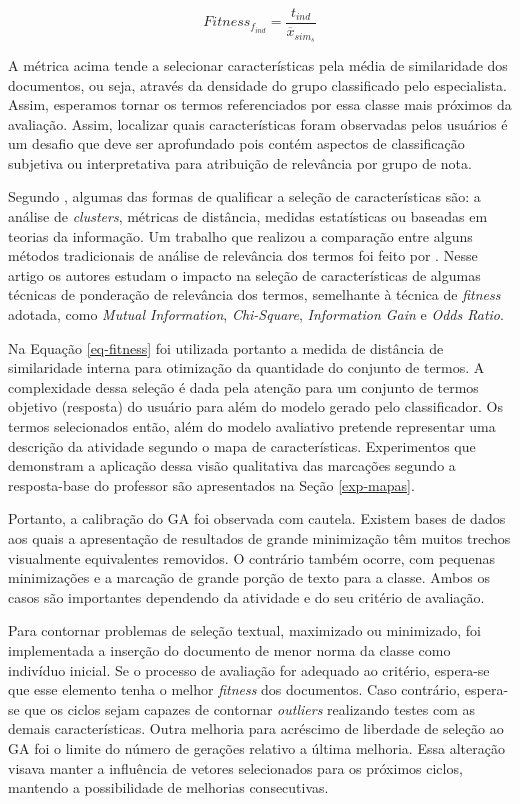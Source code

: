 \begin{equation}
Fitness_{f_{ind}} = \frac{t_{ind}}{\overline{x}_{sim_{s}}}
\label{eq-fitness}
\end{equation}

A métrica acima tende a selecionar características pela média de similaridade dos documentos, ou seja, através da densidade do grupo classificado pelo especialista. Assim, esperamos tornar os termos referenciados por essa classe mais próximos da avaliação. Assim, localizar quais características foram observadas pelos usuários é um desafio que deve ser aprofundado pois contém aspectos de classificação subjetiva ou interpretativa para atribuição de relevância por grupo de nota.


Segundo , algumas das formas de qualificar a seleção de características são: a análise de \textit{clusters}, métricas de distância, medidas estatísticas ou baseadas em teorias da informação. Um trabalho que realizou a comparação entre alguns métodos tradicionais de análise de relevância dos termos foi feito por . Nesse artigo os autores estudam o impacto na seleção de características de algumas técnicas de ponderação de relevância dos termos, semelhante à técnica de \textit{fitness} adotada, como \textit{Mutual Information}, \textit{Chi-Square}, \textit{Information Gain} e \textit{Odds Ratio}. 

Na Equação \ref{eq-fitness} foi utilizada portanto a medida de distância de similaridade interna para otimização da quantidade do conjunto de termos. A complexidade dessa seleção é dada pela atenção para um conjunto de termos objetivo (resposta) do usuário para além do modelo gerado pelo classificador. Os termos selecionados então, além do modelo avaliativo pretende representar uma descrição da atividade segundo o mapa de características. Experimentos que demonstram a aplicação dessa visão qualitativa das marcações segundo a resposta-base do professor são apresentados na Seção \ref{exp-mapas}.


Portanto, a calibração do GA foi observada com cautela. Existem bases de dados aos quais a apresentação de resultados de grande minimização têm muitos trechos visualmente equivalentes removidos. O contrário também ocorre, com pequenas minimizações e a marcação de grande porção de texto para a classe. Ambos os casos são importantes dependendo da atividade e do seu critério de avaliação.

Para contornar problemas de seleção textual, maximizado ou minimizado, foi implementada a inserção do documento de menor norma da classe como indivíduo inicial. Se o processo de avaliação for adequado ao critério, espera-se que esse elemento tenha o melhor \textit{fitness} dos documentos. Caso contrário, espera-se que os ciclos sejam capazes de contornar \textit{outliers} realizando testes com as demais características. Outra melhoria para acréscimo de liberdade de seleção ao GA foi o limite do número de gerações relativo a última melhoria. Essa alteração visava manter a influência de vetores selecionados para os próximos ciclos, mantendo a possibilidade de melhorias consecutivas.

